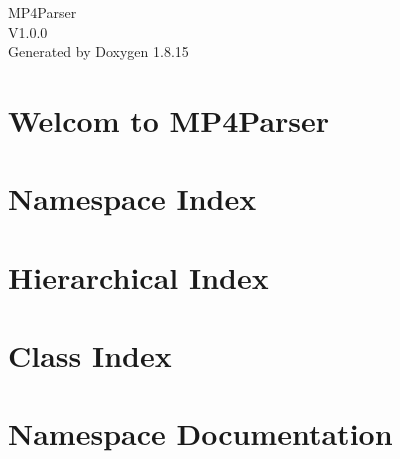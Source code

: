 \let\mypdfximage\pdfximage\def\pdfximage{\immediate\mypdfximage}\documentclass[twoside]{book}
\newcommand{\+}{\discretionary{\mbox{\scriptsize$\hookleftarrow$}}{}{}}
\newcommand{\clearemptydoublepage}{%
  \newpage{\pagestyle{empty}\cleardoublepage}%
}
\begin{document}
\hypersetup{pageanchor=false,
             bookmarksnumbered=true,
             pdfencoding=unicode
            }
\begin{titlepage}
\vspace*{7cm}
\begin{center}%
{\Large M\+P4\+Parser \\[1ex]\large V1.\+0.\+0 }\\
\vspace*{1cm}
{\large Generated by Doxygen 1.8.15}\\
\end{center}
\end{titlepage}
\clearemptydoublepage
{}
\tableofcontents
\clearemptydoublepage
{}
\hypersetup{pageanchor=true}

\chapter{Welcom to M\+P4\+Parser}
\label{md__d_1_github__m_p4_parser__r_e_a_d_m_e}

\chapter{Namespace Index}

\chapter{Hierarchical Index}

\chapter{Class Index}

\chapter{Namespace Documentation}

\end{document}

